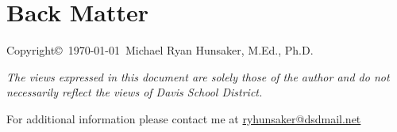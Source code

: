 \chapter*{Back Matter}
Copyright\copyright\ \today\ Michael Ryan Hunsaker, M.Ed., Ph.D.

\emph{The views expressed in this document are solely those of the author and do not necessarily reflect the views of Davis School District.}

For additional information please contact me at \href{mailto:ryhunsaker@dsdmail.net}{ryhunsaker@dsdmail.net}

